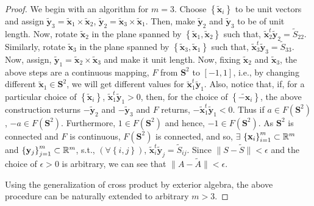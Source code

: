 \begin{proof}
We begin with an algorithm for $m=3$. Choose $\left\{\widetilde{\mathbf{x}}_i\right\}$ to be unit vectors and assign $\widetilde{\mathbf{y}}_3=\widetilde{\mathbf{x}}_1\times \widetilde{\mathbf{x}}_2$, $\widetilde{\mathbf{y}}_2=\widetilde{\mathbf{x}}_3\times \widetilde{\mathbf{x}}_1$. Then, make $\widetilde{\mathbf{y}}_2$ and $\widetilde{\mathbf{y}}_3$ to be of unit length. %
Now, rotate $\widetilde{\mathbf{x}}_2$ in the plane spanned by $\left\{\widetilde{\mathbf{x}}_1, \widetilde{\mathbf{x}}_2\right\}$ such that,
$\widetilde{\mathbf{x}}_2^t\widetilde{\mathbf{y}}_2=\widetilde{S}_{22}$. Similarly, rotate $\widetilde{\mathbf{x}}_3$ in the plane spanned by $\left\{\widetilde{\mathbf{x}}_3, \widetilde{\mathbf{x}}_1\right\}$ such that,
$\widetilde{\mathbf{x}}_3^t\widetilde{\mathbf{y}}_3=\widetilde{S}_{33}$. Now, assign, $\widetilde{\mathbf{y}}_1=\widetilde{\mathbf{x}}_2\times \widetilde{\mathbf{x}}_3$ and make it unit length. Now, fixing $\widetilde{\mathbf{x}}_2$ and $\widetilde{\mathbf{x}}_3$, the above steps are a continuous mapping, $F$ from $\mathbf{S}^2$ to $[-1,1]$, i.e., by changing different $\widetilde{\mathbf{x}}_1 \in \mathbf{S}^2$, we will get different values for $\widetilde{\mathbf{x}}_1^t\widetilde{\mathbf{y}}_1$. Also, notice that, if, for a particular choice of $\left\{\widetilde{\mathbf{x}}_i\right\}$, $\widetilde{\mathbf{x}}_1^t\widetilde{\mathbf{y}}_1>0$, then, for the choice of $\left\{\widetilde{-\mathbf{x}}_i\right\}$, the above construction returns $-\widetilde{\mathbf{y}}_2$ and $-\widetilde{\mathbf{y}}_3$ and $F$ returns, $-\widetilde{\mathbf{x}}_1^t\widetilde{\mathbf{y}}_1<0$. Thus if $a \in F\left(\mathbf{S}^2\right)$,  $-a \in F\left(\mathbf{S}^2\right)$. Furthermore, $1\in F\left(\mathbf{S}^2\right)$ and hence, $-1\in F\left(\mathbf{S}^2\right)$. As $\mathbf{S}^2$ is connected and $F$ is continuous,
$F\left(\mathbf{S}^2\right)$ is connected, and so, $\exists$ $\left\{\mathbf{x}_i\right\}_{i=1}^m\subset \mathbb{R}^m$ and $\left\{\mathbf{y}_j\right\}_{j=1}^m\subset \mathbb{R}^m$, s.t., $\left(\forall \left\{i, j\right\}\right)$, 
$\widetilde{\mathbf{x}}_i^t\widetilde{\mathbf{y}}_j = \widetilde{S}_{ij}$. Since $\|S-\widetilde{S}\|< \epsilon$ and the
choice of $\epsilon> 0$ is arbitrary, we can see that $\|A - \widetilde{A}\| < \epsilon$.

Using the generalization of cross product by exterior algebra, the above procedure can be naturally extended to arbitrary $m>3$.
\end{proof}

